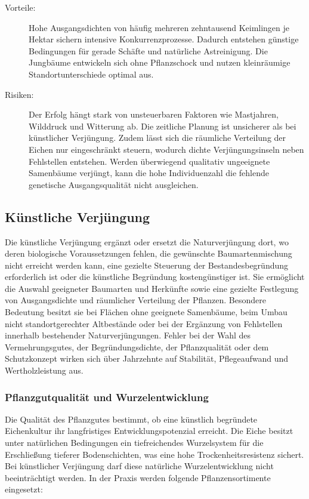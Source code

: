 \documentclass[twocolumn, bibliography=totoc, abstract=true]{scrartcl}
\begin{document}
\begin{description}
\item[Vorteile:] Hohe Ausgangsdichten von häufig mehreren zehntausend Keimlingen je Hektar sichern intensive Konkurrenzprozesse. Dadurch entstehen günstige Bedingungen für gerade Schäfte und natürliche Astreinigung. Die Jungbäume entwickeln sich ohne Pflanzschock und nutzen kleinräumige Standortunterschiede optimal aus.
\item[Risiken:] Der Erfolg hängt stark von unsteuerbaren Faktoren wie Mastjahren, Wilddruck und Witterung ab. Die zeitliche Planung ist unsicherer als bei künstlicher Verjüngung. Zudem lässt sich die räumliche Verteilung der Eichen nur eingeschränkt steuern, wodurch dichte Verjüngungsinseln neben Fehlstellen entstehen. Werden überwiegend qualitativ ungeeignete Samenbäume verjüngt, kann die hohe Individuenzahl die fehlende genetische Ausgangsqualität nicht ausgleichen.
\end{description}

\subsection{Künstliche Verjüngung}

Die künstliche Verjüngung ergänzt oder ersetzt die Naturverjüngung dort, wo deren biologische Voraussetzungen fehlen, die gewünschte Baumartenmischung nicht erreicht werden kann, eine gezielte Steuerung der Bestandesbegründung erforderlich ist oder die künstliche Begründung kostengünstiger ist. Sie ermöglicht die Auswahl geeigneter Baumarten und Herkünfte sowie eine gezielte Festlegung von Ausgangsdichte und räumlicher Verteilung der Pflanzen. Besondere Bedeutung besitzt sie bei Flächen ohne geeignete Samenbäume, beim Umbau nicht standortgerechter Altbestände oder bei der Ergänzung von Fehlstellen innerhalb bestehender Naturverjüngungen. Fehler bei der Wahl des Vermehrungsgutes, der Begründungsdichte, der Pflanzqualität oder dem Schutzkonzept wirken sich über Jahrzehnte auf Stabilität, Pflegeaufwand und Wertholzleistung aus.

\subsubsection{Pflanzgutqualität und Wurzelentwicklung}

Die Qualität des Pflanzgutes bestimmt, ob eine künstlich begründete Eichenkultur ihr langfristiges Entwicklungspotenzial erreicht. Die Eiche besitzt unter natürlichen Bedingungen ein tiefreichendes Wurzelsystem für die Erschließung tieferer Bodenschichten, was eine hohe Trockenheitsresistenz sichert. Bei künstlicher Verjüngung darf diese natürliche Wurzelentwicklung nicht beeinträchtigt werden. In der Praxis werden folgende Pflanzensortimente eingesetzt:
\end{document}
